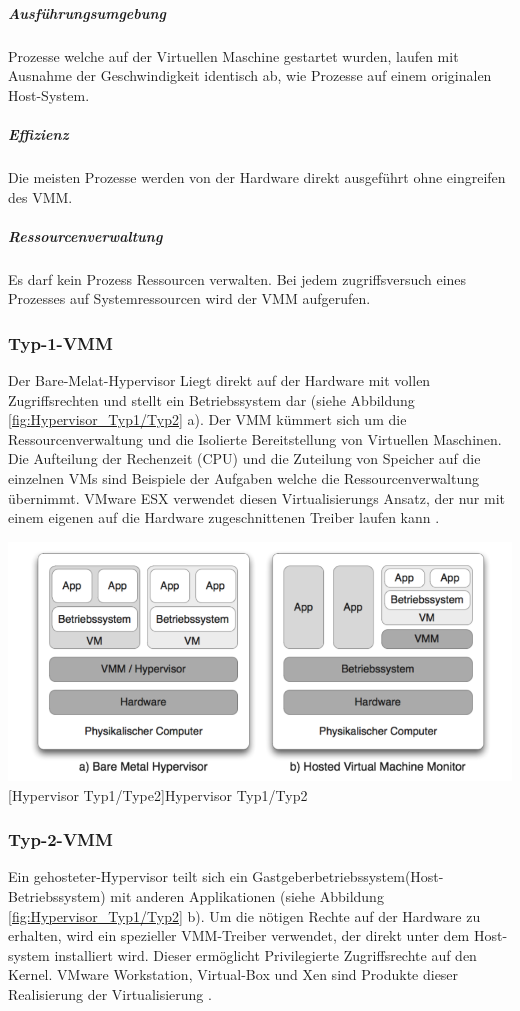 \subparagraph{Ausführungsumgebung} 
 Prozesse welche auf der Virtuellen Maschine gestartet wurden, laufen mit Ausnahme der  Geschwindigkeit identisch ab, wie Prozesse auf einem originalen Host-System.
 
\subparagraph{Effizienz} 
Die meisten Prozesse werden von der Hardware direkt ausgeführt ohne eingreifen des VMM.

\subparagraph{Ressourcenverwaltung} 
Es darf kein Prozess Ressourcen verwalten. Bei jedem zugriffsversuch eines Prozesses auf Systemressourcen wird der VMM aufgerufen.



\subsubsection{Typ-1-VMM}
Der Bare-Melat-Hypervisor Liegt direkt auf der Hardware mit vollen Zugriffsrechten und stellt ein Betriebssystem dar (siehe Abbildung \ref{fig:Hypervisor_Typ1/Typ2} a). Der VMM kümmert sich um die Ressourcenverwaltung und die Isolierte Bereitstellung von Virtuellen Maschinen. Die Aufteilung der Rechenzeit (CPU) und die Zuteilung von Speicher auf die einzelnen VMs sind Beispiele der Aufgaben welche die Ressourcenverwaltung übernimmt. VMware ESX \cite{Go-to2018ESXi} verwendet diesen Virtualisierungs Ansatz, der nur mit einem eigenen auf die Hardware zugeschnittenen Treiber laufen kann \cite{Glatz2015Betriebssysteme}.

\vspace{1em}
\begin{minipage}{\linewidth}
	\centering
	\includegraphics[width=1\linewidth]{pics/Hypervisoren.PNG}
	[Hypervisor Typ1/Type2]{Hypervisor Typ1/Typ2 \cite{Meinel2011VirtualisierungMarktubersicht} }
	\label{fig:Hypervisor_Typ1/Typ2}
\end{minipage}

\subsubsection{Typ-2-VMM}
Ein gehosteter-Hypervisor teilt sich ein Gastgeberbetriebssystem(Host-Betriebssystem) mit anderen Applikationen (siehe Abbildung \ref{fig:Hypervisor_Typ1/Typ2} b). Um die nötigen Rechte auf der Hardware zu erhalten, wird ein spezieller VMM-Treiber verwendet, der direkt unter dem Host-system installiert wird. Dieser ermöglicht Privilegierte Zugriffsrechte auf den Kernel. VMware Workstation, Virtual-Box und Xen sind Produkte dieser Realisierung der Virtualisierung \cite{Glatz2015Betriebssysteme}.

